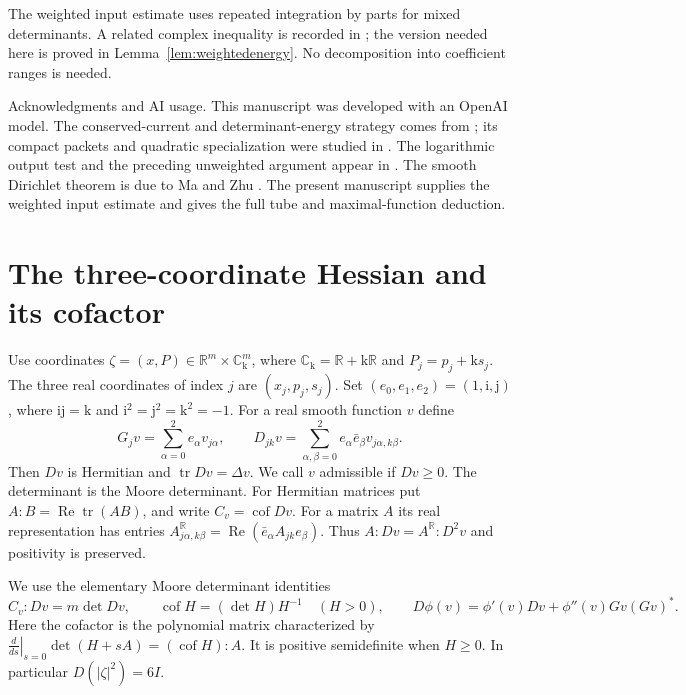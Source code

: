 \documentclass[11pt]{article}
\numberwithin{equation}{section}
\newcommand{\R}{\mathbb R}
\newcommand{\C}{\mathbb C}
\newcommand{\Rea}{\operatorname{Re}}
\DeclareMathOperator{\cof}{cof}
\DeclareMathOperator{\tr}{tr}
\begin{document}
The weighted input estimate uses repeated integration by parts for
mixed determinants. A related complex inequality is recorded in
\cite[proof of Lemma 5.1]{KN}; the version needed here is proved in
Lemma~\ref{lem:weightedenergy}. No decomposition into coefficient
ranges is needed.

Acknowledgments and AI usage. This manuscript was developed with an
OpenAI model. The conserved-current and determinant-energy strategy
comes from \cite{OpenAI}; its compact packets and quadratic
specialization were studied in \cite{Draft}. The logarithmic output
test and the preceding unweighted argument appear in
\cite{Addendum,AllDimensions}. The smooth Dirichlet theorem is due to
Ma and Zhu \cite{MZ}. The present manuscript supplies the weighted
input estimate and gives the full tube and maximal-function deduction.

\section{The three-coordinate Hessian and its cofactor}

Use coordinates $\zeta=(x,P)\in\R^m\times\C_{\mathrm{k}}^m$, where
$\C_{\mathrm{k}}=\R+\mathrm{k}\R$ and
$P_j=p_j+\mathrm{k} s_j$.
The three real coordinates of index $j$ are $(x_j,p_j,s_j)$.
Set $(e_0,e_1,e_2)=(1,\mathrm{i},\mathrm{j})$, where
$\mathrm{i}\mathrm{j}=\mathrm{k}$ and
$\mathrm{i}^2=\mathrm{j}^2=\mathrm{k}^2=-1$.
For a real smooth function $v$ define
\[
 G_jv=\sum_{\alpha=0}^2 e_\alpha v_{j\alpha},\qquad
 D_{jk}v=\sum_{\alpha,\beta=0}^2e_\alpha\bar e_\beta
                                      v_{j\alpha,k\beta}.
\]
Then $Dv$ is Hermitian and $\tr Dv=\Delta v$.
We call $v$ admissible if $Dv\ge0$.
The determinant is the Moore determinant. For Hermitian matrices put
$A:B=\Rea\tr(AB)$, and write $C_v=\cof Dv$.
For a matrix $A$ its real representation has entries
$A^{\R}_{j\alpha,k\beta}=\Rea(\bar e_\alpha A_{jk}e_\beta)$.
Thus $A:Dv=A^{\R}:D^2v$ and positivity is preserved.

We use the elementary Moore determinant identities
\[
 C_v:Dv=m\det Dv,\qquad
 \cof H=(\det H)H^{-1}\quad(H>0),\qquad
 D\phi(v)=\phi'(v)Dv+\phi''(v)Gv(Gv)^*.
\]
Here the cofactor is the polynomial matrix characterized by
$\left.\frac{d}{ds}\right|_{s=0}\det(H+sA)=(\cof H):A$.
It is positive semidefinite when $H\ge0$.
In particular $D(|\zeta|^2)=6I$.
\end{document}
